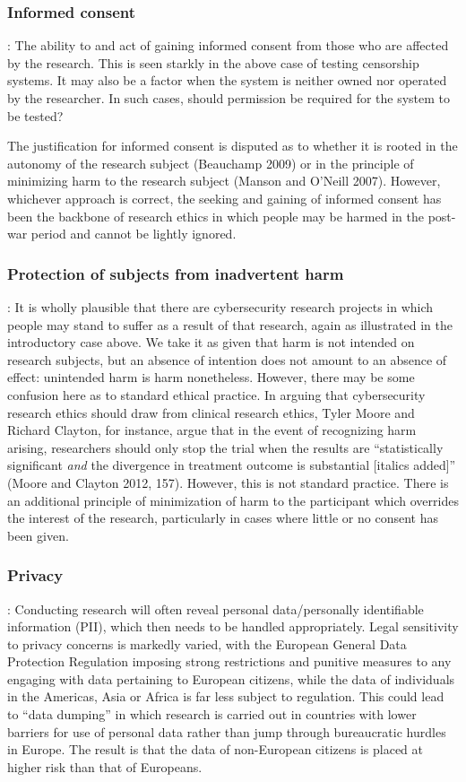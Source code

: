 \documentclass{svjour3}                     %
\begin{document}
\begin{itemize}
\subsubsection{Informed consent}:
The ability to and act of gaining informed consent from those who are affected by the research.  This is seen starkly in the above case of testing censorship systems. It may also be a factor when the system is neither owned nor operated by the researcher. In such cases, should permission be required for the system to be tested?

The justification for informed consent is disputed as to whether it is rooted in the autonomy of the research subject (Beauchamp 2009) or in the principle of minimizing harm to the research subject (Manson and O’Neill 2007). However, whichever approach is correct, the seeking and gaining of informed consent has been the backbone of research ethics in which people may be harmed in the post-war period and cannot be lightly ignored.

\subsubsection{Protection of subjects from inadvertent harm}:
It is wholly plausible that there are cybersecurity research projects in which people may stand to suffer as a result of that research, again as illustrated in the introductory case above. We take it as given that harm is not intended on research subjects, but an absence of intention does not amount to an absence of effect: unintended harm is harm nonetheless. However, there may be some confusion here as to standard ethical practice. In arguing that cybersecurity research ethics should draw from clinical research ethics, Tyler Moore and Richard Clayton, for instance, argue that in the event of recognizing harm arising, researchers should only stop the trial when the results are “statistically significant \emph{and} the divergence in treatment outcome is substantial [italics added]” (Moore and Clayton 2012, 157). However, this is not standard practice. There is an additional principle of minimization of harm to the participant which overrides the interest of the research, particularly in cases where little or no consent has been given.

\subsubsection{Privacy}:
Conducting research will often reveal personal data/personally identifiable information (PII), which then needs to be handled appropriately. Legal sensitivity to privacy concerns is markedly varied, with the European General Data Protection Regulation imposing strong restrictions and punitive measures to any engaging with data pertaining to European citizens, while the data of individuals in the Americas, Asia or Africa is far less subject to regulation. This could lead to “data dumping” in which research is carried out in countries with lower barriers for use of personal data rather than jump through bureaucratic hurdles in Europe.  The result is that the data of non-European citizens is placed at higher risk than that of Europeans.


\end{itemize}
\end{document}
